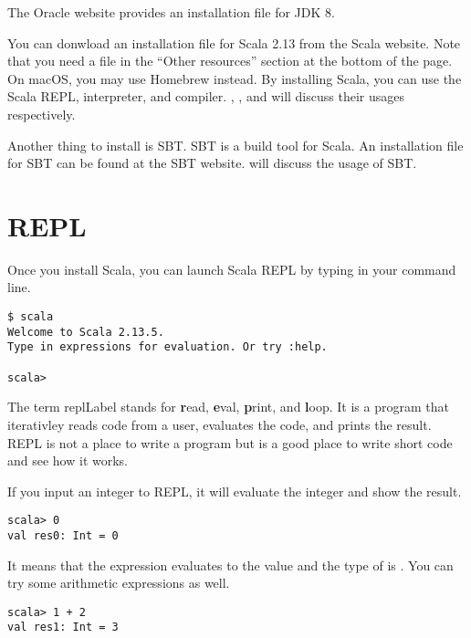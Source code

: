 The Oracle website
provides an installation file for JDK 8.

You can donwload an installation file for Scala 2.13 from the Scala
website. Note that you need a
file in the ``Other resources'' section at the bottom of the page.
On macOS, you may use Homebrew instead. By installing Scala, you can use the
Scala REPL, interpreter, and compiler. ,
, and  will discuss
their usages respectively.

Another thing to install is SBT. SBT is a build tool for Scala. An installation
file for SBT can be found at the SBT
website.
 will discuss the usage of SBT.

\section{REPL}

Once you install Scala, you can launch Scala REPL by typing  in
your command line.

\begin{verbatim}
$ scala
Welcome to Scala 2.13.5.
Type in expressions for evaluation. Or try :help.

scala>
\end{verbatim}

The term \acrshort{replLabel} stands for \textbf{r}ead, \textbf{e}val, \textbf{p}rint, and
\textbf{l}oop.
It is a program that iterativley reads code from a user, evaluates the code,
and prints the result. REPL is not a place to write a program but is a good
place to write short code and see how it works.

If you input an integer to REPL, it will evaluate the integer and show the
result.

\begin{verbatim}
scala> 0
val res0: Int = 0
\end{verbatim}

It means that the expression  evaluates to the value  and the type of
 is .
You can try some arithmetic expressions as well.

\begin{verbatim}
scala> 1 + 2
val res1: Int = 3
\end{verbatim}

